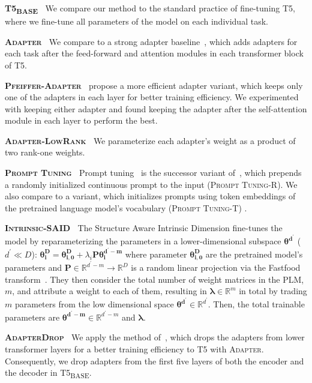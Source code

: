 \documentclass{article}
\newcommand{\basebase}{T5\textsubscript{\tiny BASE}\xspace}
\newcommand{\adapter}{\textsc{Adapter}\xspace}
\newcommand{\adapterlowrank}{\textsc{Adapter-LowRank}\xspace}
\newcommand{\intrinsic}{\textsc{Intrinsic-SAID}\xspace}
\newcommand{\prompttuning}{\textsc{Prompt Tuning}\xspace}
\newcommand{\prompttuningrandom}{\textsc{Prompt Tuning-R}\xspace}
\newcommand{\prompttuningtokens}{\textsc{Prompt Tuning-T}\xspace}
\newcommand{\pfeifferadapter}{\textsc{Pfeiffer-Adapter}\xspace}
\newcommand{\adapterdrop}{\textsc{AdapterDrop}\xspace}
\begin{document}
\textbf{\basebase} $\:$ We compare our method to the standard practice of fine-tuning T5, where we fine-tune all parameters of the model on each individual task. 

\textbf{\adapter} $\:$ We compare to a strong adapter baseline~\citep{houlsby2019parameter}, which adds adapters for each task after the feed-forward and attention modules in each transformer block of T5. 

\textbf{\pfeifferadapter} $\:$ \citet{Pfeiffer2021adapterfusion} propose a more efficient adapter variant, which keeps only one of the adapters in each layer for better training efficiency. We experimented with keeping either adapter and found keeping the adapter after the self-attention module in each layer to perform the best.

\textbf{\adapterlowrank} $\:$ We parameterize each adapter's weight as a product of two rank-one weights. 

\textbf{\prompttuning} $\:$ Prompt tuning~\citep{lester2021power} is the successor variant of~\citet{li2021prefix}, which prepends a randomly initialized continuous prompt to the input (\prompttuningrandom). We also compare to a variant, which initializes prompts using token embeddings of the pretrained language model's vocabulary (\prompttuningtokens) \citep{lester2021power}.


\textbf{\intrinsic} $\:$ The Structure Aware Intrinsic Dimension \citep{aghajanyan2020intrinsic} fine-tunes the model by reparameterizing the parameters in a lower-dimensional subspace $\bm{\theta^{d^{\prime}}}$ ($d^{\prime} \ll D$): 
$\bm{\theta_i^D} = \bm{\theta^D_{i,0}} + \lambda_i \bm{P} \bm{\theta^{d^{\prime}-m}_i}$
where parameter $\bm{\theta^D_{i,0}}$ are the pretrained model's parameters and $\bm{P} \in \mathbb{R}^{d^\prime-m}\to \mathbb{R}^D$ is a random linear projection via the Fastfood transform~\citep{le2013fastfood}. They then consider the total number of weight matrices in the PLM, $m$, and attribute a weight to each of them, resulting in $\bm{\lambda} \in\mathbb{R}^m$ in total by trading $m$ parameters from the low dimensional space $\bm{\theta^{d^{\prime}}} \in \mathbb{R}^{d^{\prime}}$. Then, the total trainable parameters are $\bm{\theta^{d^{\prime}-m}} \in \mathbb{R}^{d^{\prime} - m} $ and $\bm{\lambda}$.


\textbf{\adapterdrop} $\:$ We apply the method of~\citet{Ruckle2020adapterdrop}, which drops the adapters from lower transformer layers for a better training efficiency to T5 with \adapter. Consequently, we drop adapters from the first five layers of both the encoder and the decoder in \basebase.
\end{document}
